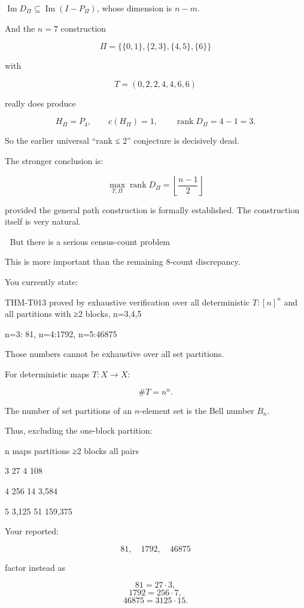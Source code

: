\(\operatorname{Im}D_\Pi\subseteq\operatorname{Im}(I-P_\Pi)\), whose dimension is \(n-m\).


And the \(n=7\) construction

\[
\Pi=\{\{0,1\},\{2,3\},\{4,5\},\{6\}\}  
\]

with

\[
T=(0,2,2,4,4,6,6)  
\]

really does produce

\[
H_\Pi=P_4,\qquad c(H_\Pi)=1,\qquad  
\operatorname{rank}D_\Pi=4-1=3.  
\]

So the earlier universal “rank ≤ 2” conjecture is decisively dead.


The stronger conclusion is:

\[
\boxed{\max_{T,\Pi}\operatorname{rank}D_\Pi  
=\left\lfloor\frac{n-1}{2}\right\rfloor}  
\]

provided the general path construction is formally established. The construction itself is very natural.



🔴 But there is a serious census-count problem


This is more important than the remaining 8-count discrepancy.


You currently state:




THM-T013 proved by exhaustive verification over all deterministic \(T:[n]^n\) and all partitions with ≥2 blocks, n=3,4,5

n=3: 81, n=4:1792, n=5:46875




Those numbers cannot be exhaustive over all set partitions.


For deterministic maps \(T:X\to X\):

\[
\#T=n^n.  
\]

The number of set partitions of an \(n\)-element set is the Bell number \(B_n\).


Thus, excluding the one-block partition:


n	maps	partitions ≥2 blocks	all pairs


3	27	4	108

4	256	14	3,584

5	3,125	51	159,375


Your reported:

\[
81,\quad1792,\quad46875  
\]

factor instead as

\[
81=27\cdot3,  
\]
\[
1792=256\cdot7,  
\]
\[
46875=3125\cdot15.  
\]

